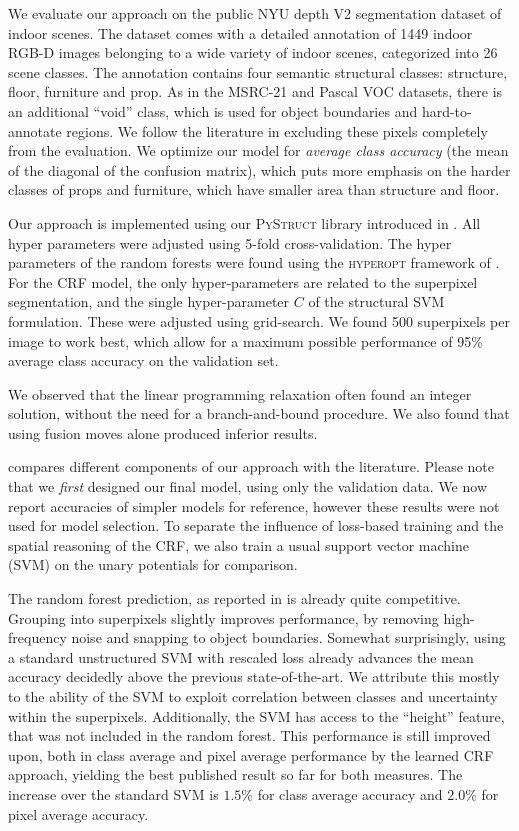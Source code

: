 We evaluate our approach on the public NYU depth V2 segmentation dataset of
indoor scenes.  The dataset comes with a detailed annotation of 1449 indoor
\mbox{RGB-D} images belonging to a wide variety of indoor scenes, categorized into 26
scene classes.  The annotation contains four semantic structural classes:
structure, floor, furniture and prop. As in the MSRC-21 and Pascal VOC
datasets, there is an additional ``void'' class, which is used for object
boundaries and hard-to-annotate regions. We follow the
literature in excluding these pixels completely from the evaluation.
We optimize our model for \emph{average class accuracy} (the mean of the
diagonal of the confusion matrix), which puts more emphasis on the harder
classes of props and furniture, which have smaller area than structure and
floor.

Our approach is implemented using our \textsc{PyStruct}
library introduced in .
%
All hyper parameters were adjusted using 5-fold cross-validation. The
hyper parameters of the random forests were found using the \textsc{hyperopt}
framework of \cite{bergstra2011algorithms}. For the CRF model, the only
hyper-parameters are related to the superpixel segmentation, and the single
hyper-parameter $C$ of the structural SVM formulation. These were adjusted
using grid-search.
We found 500 superpixels per image to work best, which allow for a maximum
possible performance of 95\% average class accuracy on the validation set.

We observed that the linear programming relaxation
often found an integer solution, without the need for a branch-and-bound procedure. We also found
that using fusion moves alone produced inferior results.

 compares different components of our approach with the literature.
Please note that we \emph{first} designed our final model, using only the
validation data. We now report accuracies of simpler models for reference,
however these results were not used for model selection. To separate
the influence of loss-based training and the spatial reasoning of the CRF,
we also train a usual support vector machine (SVM) on the unary potentials for comparison.

The random forest prediction, as reported in \citet{stueckler2013} is already quite competitive.
Grouping into superpixels slightly improves performance, by removing
high-frequency noise and snapping to object boundaries. Somewhat surprisingly,
using a standard unstructured SVM with rescaled loss already advances the mean
accuracy decidedly above the previous state-of-the-art. We
attribute this mostly to the ability of the SVM to exploit correlation between
classes and uncertainty within the superpixels.
Additionally, the SVM has access to the ``height'' feature, that was not
included in the random forest.
This performance is still improved upon, both in class average and pixel
average performance by the learned CRF approach, yielding
the best published result so far for both measures. The increase over the
standard SVM is $1.5\%$ for class average accuracy and $2.0\%$ for pixel
average accuracy.

